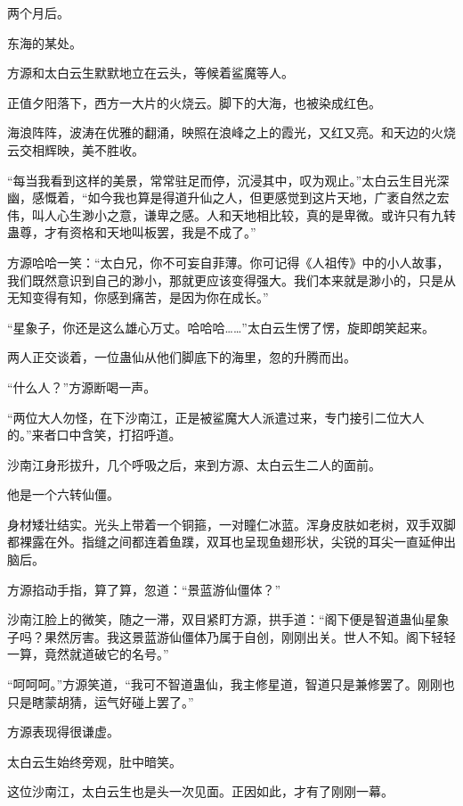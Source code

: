 
\begin{this_body}

两个月后。

东海的某处。

方源和太白云生默默地立在云头，等候着鲨魔等人。

正值夕阳落下，西方一大片的火烧云。脚下的大海，也被染成红色。

海浪阵阵，波涛在优雅的翻涌，映照在浪峰之上的霞光，又红又亮。和天边的火烧云交相辉映，美不胜收。

“每当我看到这样的美景，常常驻足而停，沉浸其中，叹为观止。”太白云生目光深幽，感慨着，“如今我也算是得道升仙之人，但更感觉到这片天地，广袤自然之宏伟，叫人心生渺小之意，谦卑之感。人和天地相比较，真的是卑微。或许只有九转蛊尊，才有资格和天地叫板罢，我是不成了。”

方源哈哈一笑：“太白兄，你不可妄自菲薄。你可记得《人祖传》中的小人故事，我们既然意识到自己的渺小，那就更应该变得强大。我们本来就是渺小的，只是从无知变得有知，你感到痛苦，是因为你在成长。”

“星象子，你还是这么雄心万丈。哈哈哈……”太白云生愣了愣，旋即朗笑起来。

两人正交谈着，一位蛊仙从他们脚底下的海里，忽的升腾而出。

“什么人？”方源断喝一声。

“两位大人勿怪，在下沙南江，正是被鲨魔大人派遣过来，专门接引二位大人的。”来者口中含笑，打招呼道。

沙南江身形拔升，几个呼吸之后，来到方源、太白云生二人的面前。

他是一个六转仙僵。

身材矮壮结实。光头上带着一个铜箍，一对瞳仁冰蓝。浑身皮肤如老树，双手双脚都裸露在外。指缝之间都连着鱼蹼，双耳也呈现鱼翅形状，尖锐的耳尖一直延伸出脑后。

方源掐动手指，算了算，忽道：“景蓝游仙僵体？”

沙南江脸上的微笑，随之一滞，双目紧盯方源，拱手道：“阁下便是智道蛊仙星象子吗？果然厉害。我这景蓝游仙僵体乃属于自创，刚刚出关。世人不知。阁下轻轻一算，竟然就道破它的名号。”

“呵呵呵。”方源笑道，“我可不智道蛊仙，我主修星道，智道只是兼修罢了。刚刚也只是瞎蒙胡猜，运气好碰上罢了。”

方源表现得很谦虚。

太白云生始终旁观，肚中暗笑。

这位沙南江，太白云生也是头一次见面。正因如此，才有了刚刚一幕。


\end{this_body}
